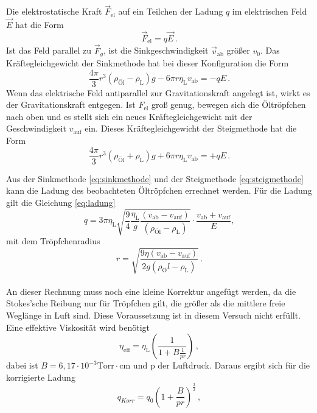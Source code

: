 Die elektrostatische Kraft $\vec{F}_\text{el}$ auf ein Teilchen der Ladung $q$ im elektrischen Feld $\vec{E}$ hat die Form 
\begin{equation*}
    \vec{F}_\text{el} = q \vec{E}\, .
    \label{eq:Estat}
\end{equation*}
Ist das Feld parallel zu $\vec{F}_g$, ist die Sinkgeschwindigkeit $\vec{v}_\text{ab}$ größer $v_0$.
Das Kräftegleichgewicht der Sinkmethode hat bei dieser Konfiguration die Form 
\begin{equation}
    \frac{4 \pi}{3} r^3(\rho_\text{Öl} - \rho_\text{L})g - 6 \pi r \eta_\text{L} v_\text{ab} = - q E \, .
    \label{eq:sinkmethode}
\end{equation}
Wenn das elektrische Feld antiparallel zur Gravitationskraft angelegt ist, wirkt es der Gravitationskraft entgegen.
Ist $F_\text{el}$ groß genug, bewegen sich die Öltröpfchen nach oben und es stellt sich ein neues Kräftegleichgewicht mit der Geschwindigkeit $v_\text{auf}$ ein.
Dieses Kräftegleichgewicht der Steigmethode hat die Form
\begin{equation}
    \frac{4 \pi}{3} r^3(\rho_\text{Öl} + \rho_\text{L})g + 6 \pi r \eta_\text{L} v_\text{ab} = + q E \, .
    \label{eq:steigmethode}
\end{equation}

Aus der Sinkmethode \eqref{eq:sinkmethode} und der Steigmethode \eqref{eq:steigmethode} kann die Ladung des beobachteten Öltröpfchen errechnet werden.
Für die Ladung gilt die Gleichung \eqref{eq:ladung}
\begin{equation}
    q = 3 \pi \eta_\text{L} \sqrt{\frac{9}{4} \frac{\eta_\text{L}}{g} \frac{(v_\text{ab} - v_\text{auf})}{(\rho_\text{Öl} - \rho_\text{L})}} \cdot \frac{v_\text{ab}+ v_\text{auf}}{E} ,
    \label{eq:ladung}
\end{equation}
mit dem Tröpfchenradius 
\begin{equation}
    r = \sqrt{\frac{9 \eta (v_\text{ab}-v_\text{auf})}{2 g (\rho_Öl - \rho_\text{L})}}\, .
    \label{eq:rmitEfled}
\end{equation} \\

An dieser Rechnung muss noch eine kleine Korrektur angefügt werden, da die Stokes'sche Reibung nur für Tröpfchen gilt, die größer als die mittlere freie Weglänge in Luft sind.
Diese Voraussetzung ist in diesem Versuch nicht erfüllt. Eine effektive Viskosität wird benötigt
\begin{equation}
    \eta_\text{eff} = \eta_\text{L} \left( \frac{1}{1+ B \frac{1}{p r}}       \right) \, ,
    \label{eq:Veff}
\end{equation}
dabei ist $B = 6,17 \cdot 10^{-3} \text{Torr} \cdot \unit{\centi\meter}$ und p der Luftdruck. Daraus ergibt sich für die korrigierte Ladung
\begin{equation}
    q_{Korr} = q_0 \left(1 + \frac{B}{p r}\right)^{\frac{3}{2}}  \, ,
    \label{eq:qKorr}
\end{equation}
